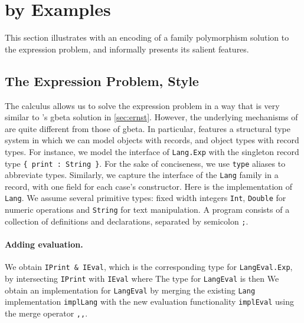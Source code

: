 
\section{\namee by Examples}
\label{nested:sec:overview}

This section illustrates \namee with an encoding of a family polymorphism
solution to the expression problem, and informally presents its salient
features.


\subsection{The Expression Problem, \namee Style}

The \namee calculus allows us to solve the expression problem in a way that is
very similar to \citeauthor{Ernst_2001}'s \textsf{gbeta} solution in \cref{sec:ernst}.
However, the underlying mechanisms of \namee are quite different from those of
\textsf{gbeta}. In particular, \namee features a structural type system in which we can
model objects with records, and object types with record types. For instance, we
model the interface of \lstinline{Lang.Exp} with the singleton record type
\lstinline${ print : String }$. For the sake of conciseness, we use \lstinline{type} aliases
to abbreviate types.
Similarly, we capture the interface of the \lstinline{Lang} family in a record,
with one field for each case's constructor.
Here is the implementation of \lstinline{Lang}.
We assume several primitive types: fixed width integers \lstinline{Int},
\lstinline{Double} for numeric operations and \lstinline{String} for text
manipulation. A \namee program consists of a collection of definitions and
declarations, separated by semicolon \lstinline{;}.

\paragraph{Adding evaluation.}
We obtain \lstinline{IPrint & IEval}, which is the corresponding type for \lstinline{LangEval.Exp}, by
intersecting \lstinline{IPrint} with \lstinline{IEval} where
The type for \lstinline{LangEval} is then
We obtain an implementation for \lstinline{LangEval} by merging the existing
\lstinline{Lang} implementation \lstinline{implLang} with the new evaluation
functionality \lstinline{implEval} using the merge operator \lstinline{,,}.

